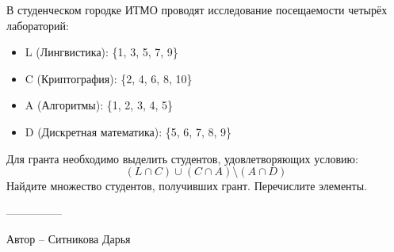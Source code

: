 \question
В студенческом городке ИТМО проводят исследование посещаемости четырёх лабораторий:

\begin{itemize}
    \item L (Лингвистика): \{1, 3, 5, 7, 9\}
    \item C (Криптография): \{2, 4, 6, 8, 10\}
    \item A (Алгоритмы): \{1, 2, 3, 4, 5\}
    \item D (Дискретная математика): \{5, 6, 7, 8, 9\}
\end{itemize}

Для гранта необходимо выделить студентов, удовлетворяющих условию:
$$(L \cap  C) \cup (C \cap A) \setminus (A \cap D)$$
Найдите множество студентов, получивших грант. Перечислите элементы.

---------------

Автор -- Ситникова Дарья